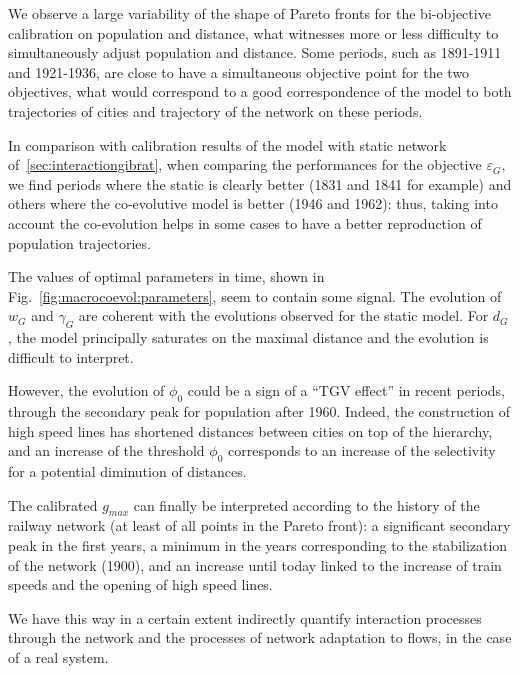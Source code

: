 We observe a large variability of the shape of Pareto fronts for the bi-objective calibration on population and distance, what witnesses more or less difficulty to simultaneously adjust population and distance. Some periods, such as 1891-1911 and 1921-1936, are close to have a simultaneous objective point for the two objectives, what would correspond to a good correspondence of the model to both trajectories of cities and trajectory of the network on these periods. 

In comparison with calibration results of the model with static network of~\ref{sec:interactiongibrat}, when comparing the performances for the objective $\varepsilon_G$, we find periods where the static is clearly better (1831 and 1841 for example) and others where the co-evolutive model is better (1946 and 1962): thus, taking into account the co-evolution helps in some cases to have a better reproduction of population trajectories.


The values of optimal parameters in time, shown in Fig.~\ref{fig:macrocoevol:parameters}, seem to contain some signal. The evolution of $w_G$ and $\gamma_G$ are coherent with the evolutions observed for the static model. For $d_G$, the model principally saturates on the maximal distance and the evolution is difficult to interpret. 

However, the evolution of $\phi_0$ could be a sign of a ``TGV effect'' in recent periods, through the secondary peak for population after 1960. Indeed, the construction of high speed lines has shortened distances between cities on top of the hierarchy, and an increase of the threshold $\phi_0$ corresponds to an increase of the selectivity for a potential diminution of distances.


The calibrated $g_{max}$ can finally be interpreted according to the history of the railway network (at least of all points in the Pareto front): a significant secondary peak in the first years, a minimum in the years corresponding to the stabilization of the network (1900), and an increase until today linked to the increase of train speeds and the opening of high speed lines. 


We have this way in a certain extent indirectly quantify interaction processes through the network and the processes of network adaptation to flows, in the case of a real system.


